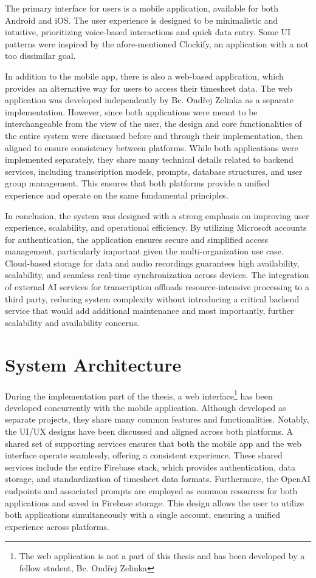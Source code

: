 \documentclass[
  digital,     %
  oneside,     %
  nosansbold,  %
  nocolorbold, %
  lof,         %
  lot,         %
]{fithesis4}
\begin{document}
The primary interface for users is a mobile application, available for both Android and \gls{iOS}. The user experience is designed to be minimalistic and intuitive, prioritizing voice-based interactions and quick data entry. Some \gls{UI} patterns were inspired by the afore-mentioned Clockify, an application with a not too dissimilar goal.  

In addition to the mobile app, there is also a web-based application, which provides an alternative way for users to access their timesheet data. The web application was developed independently by Bc. Ondřej Zelinka as a separate implementation. However, since both applications were meant to be interchangeable from the view of the user, the design and core functionalities of the entire system were discussed before and through their implementation, then aligned to ensure consistency between platforms. While both applications were implemented separately, they share many technical details related to backend services, including transcription models, prompts, database structures, and user group management. This ensures that both platforms provide a unified experience and operate on the same fundamental principles.

In conclusion, the system was designed with a strong emphasis on improving user experience, scalability, and operational efficiency. By utilizing Microsoft accounts for authentication, the application ensures secure and simplified access management, particularly important given the multi-organization use case. Cloud-based storage for data and audio recordings guarantees high availability, scalability, and seamless real-time synchronization across devices. The integration of external \gls{AI} services for transcription offloads resource-intensive processing to a third party, reducing system complexity without introducing a critical backend service that would add additional maintenance and most importantly, further scalability and availability concerns.

\section{System Architecture}

During the implementation part of the thesis, a web interface\footnote{The web application is not a part of this thesis and has been developed by a fellow student, Bc. Ondřej Zelinka} has been developed concurrently with the mobile application. Although developed as separate projects, they share many common features and functionalities. Notably, the \gls{UI}/\gls{UX} designs have been discussed and aligned across both platforms. A shared set of supporting services ensures that both the mobile app and the web interface operate seamlessly, offering a consistent experience. These shared services include the entire Firebase stack, which provides authentication, data storage, and standardization of timesheet data formats. Furthermore, the OpenAI endpoints and associated prompts are employed as common resources for both applications and saved in Firebase storage. This design allows the user to utilize both applications simultaneously with a single account, ensuring a unified experience across platforms.
\end{document}
